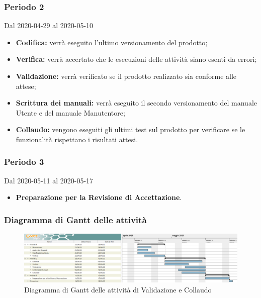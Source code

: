 \subsubsection{Periodo 2} 
Dal 2020-04-29 al 2020-05-10
\begin{itemize}
	\item \textbf{Codifica:} verrà eseguito l'ultimo versionamento del prodotto;
	\item \textbf{Verifica:} verrà accertato che le esecuzioni delle attività siano esenti da errori;
	\item \textbf{Validazione:} verrà verificato se il prodotto realizzato sia conforme alle attese;
	\item \textbf{Scrittura dei manuali:} verrà eseguito il secondo versionamento del manuale Utente e del manuale Manutentore;
	\item \textbf{Collaudo:} vengono eseguiti gli ultimi test sul prodotto per verificare se le funzionalità rispettano i risultati attesi.
\end{itemize}
\subsubsection{Periodo 3} 
Dal 2020-05-11 al 2020-05-17
\begin{itemize}
	\item \textbf{Preparazione per la Revisione di Accettazione}.
\end{itemize}


\newpage
\begin{landscape}
	\subsubsection{Diagramma di Gantt delle attività}
	\pagestyle{empty}
	\begin{figure}[h]
		\caption{Diagramma di Gantt delle attività di Validazione e Collaudo}
		\begin{center}	
			\includegraphics[scale=1.6]{sezioni/DiagrammiGantt/Validazione.png}
		\end{center}
		
	\end{figure}
\end{landscape}